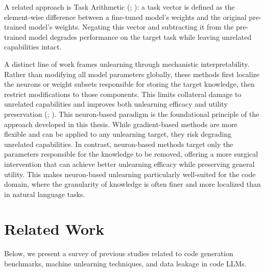 \documentclass[mscthesis]{usiinfthesis}
\begin{document}
\par\vspace{1em}
A related approach is Task Arithmetic (\citet{ilharco2023editingmodelstaskarithmetic}; \citet{cai2026perparametertaskarithmeticunlearning}): a task vector is defined as the element-wise difference between a fine-tuned model's weights and the original pre-trained model's weights.
Negating this vector and subtracting it from the pre-trained model degrades performance on the target task while leaving unrelated capabilities intact.
\par\vspace{1em}
A distinct line of work frames unlearning through mechanistic interpretability. Rather than modifying all model parameters globally, these methods first localize the neurons or weight subsets responsible for storing the target knowledge, then restrict modifications to those components. This limits collateral damage to unrelated capabilities and improves both unlearning efficacy and utility preservation (\citet{jia2025waglestrategicweightattribution}; \citet{pochinkov2024dissectinglanguagemodelsmachine}). This neuron-based paradigm is the foundational principle of the approach developed in this thesis.
While gradient-based methods are more flexible and can be applied to any unlearning target, they risk degrading unrelated capabilities. In contrast, neuron-based methods target only the parameters responsible for the knowledge to be removed, offering a more surgical intervention that can achieve better unlearning efficacy while preserving general utility. This makes neuron-based unlearning particularly well-suited for the code domain, where the granularity of knowledge is often finer and more localized than in natural language tasks.

\section{Related Work}
Below, we present a survey of previous studies related to code generation benchmarks, machine unlearning techniques, and data leakage in code LLMs.
\end{document}
